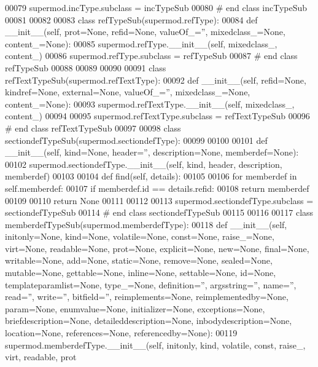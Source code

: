 \begin{DoxyCode}
00079 supermod.incType.subclass = incTypeSub
00080 \textcolor{comment}{# end class incTypeSub}
00081 
00082 
00083 \textcolor{keyword}{class }refTypeSub(supermod.refType):
00084     \textcolor{keyword}{def }__init__(self, prot=None, refid=None, valueOf\_='', mixedclass\_=None, content\_=None):
00085         supermod.refType.\_\_init\_\_(self, mixedclass\_, content\_)
00086 supermod.refType.subclass = refTypeSub
00087 \textcolor{comment}{# end class refTypeSub}
00088 
00089 
00090 
00091 \textcolor{keyword}{class }refTextTypeSub(supermod.refTextType):
00092     \textcolor{keyword}{def }__init__(self, refid=None, kindref=None, external=None, valueOf\_='', mixedclass\_=None, 
      content\_=None):
00093         supermod.refTextType.\_\_init\_\_(self, mixedclass\_, content\_)
00094 
00095 supermod.refTextType.subclass = refTextTypeSub
00096 \textcolor{comment}{# end class refTextTypeSub}
00097 
00098 \textcolor{keyword}{class }sectiondefTypeSub(supermod.sectiondefType):
00099 
00100 
00101     \textcolor{keyword}{def }__init__(self, kind=None, header='', description=None, memberdef=None):
00102         supermod.sectiondefType.\_\_init\_\_(self, kind, header, description, memberdef)
00103 
00104     \textcolor{keyword}{def }find(self, details):
00105 
00106         \textcolor{keywordflow}{for} memberdef \textcolor{keywordflow}{in} self.memberdef:
00107             \textcolor{keywordflow}{if} memberdef.id == details.refid:
00108                 \textcolor{keywordflow}{return} memberdef
00109 
00110         \textcolor{keywordflow}{return} \textcolor{keywordtype}{None}
00111 
00112 
00113 supermod.sectiondefType.subclass = sectiondefTypeSub
00114 \textcolor{comment}{# end class sectiondefTypeSub}
00115 
00116 
00117 \textcolor{keyword}{class }memberdefTypeSub(supermod.memberdefType):
00118     \textcolor{keyword}{def }__init__(self, initonly=None, kind=None, volatile=None, const=None, raise\_=None, virt=None, 
      readable=None, prot=None, explicit=None, new=None, final=None, writable=None, add=None, static=None, remove=None, 
      sealed=None, mutable=None, gettable=None, inline=None, settable=None, id=None, templateparamlist=None, 
      type\_=None, definition='', argsstring='', name='', read='', write='', bitfield='', reimplements=None, 
      reimplementedby=None, param=None, enumvalue=None, initializer=None, exceptions=None, briefdescription=None, 
      detaileddescription=None, inbodydescription=None, location=None, references=None, referencedby=None):
00119         supermod.memberdefType.\_\_init\_\_(self, initonly, kind, volatile, const, raise\_, virt, readable, prot

\end{DoxyCode}
